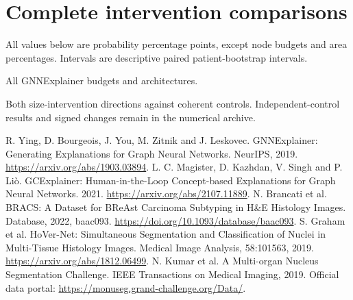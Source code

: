 \documentclass[11pt,a4paper]{article}
\begin{document}
\appendix
\section{Complete intervention comparisons}
All values below are probability percentage points, except node budgets and area percentages. Intervals are descriptive paired patient-bootstrap intervals.
\begin{table}[htbp]\centering\small

\caption{All GNNExplainer budgets and architectures.}
\end{table}
\begin{table}[htbp]\centering\small
\resizebox{\linewidth}{!}{}
\caption{Both size-intervention directions against coherent controls. Independent-control results and signed changes remain in the numerical archive.}
\end{table}

\begin{thebibliography}{9}
 R. Ying, D. Bourgeois, J. You, M. Zitnik and J. Leskovec. GNNExplainer: Generating Explanations for Graph Neural Networks. NeurIPS, 2019. \url{https://arxiv.org/abs/1903.03894}.
 L. C. Magister, D. Kazhdan, V. Singh and P. Li\`o. GCExplainer: Human-in-the-Loop Concept-based Explanations for Graph Neural Networks. 2021. \url{https://arxiv.org/abs/2107.11889}.
 N. Brancati et al. BRACS: A Dataset for BReAst Carcinoma Subtyping in H\&E Histology Images. Database, 2022, baac093. \url{https://doi.org/10.1093/database/baac093}.
 S. Graham et al. HoVer-Net: Simultaneous Segmentation and Classification of Nuclei in Multi-Tissue Histology Images. Medical Image Analysis, 58:101563, 2019. \url{https://arxiv.org/abs/1812.06499}.
 N. Kumar et al. A Multi-organ Nucleus Segmentation Challenge. IEEE Transactions on Medical Imaging, 2019. Official data portal: \url{https://monuseg.grand-challenge.org/Data/}.
\end{thebibliography}
\end{document}
